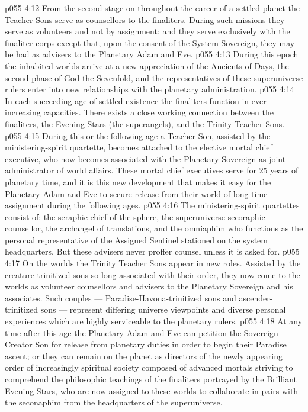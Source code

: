 \vs p055 4:12 From the second stage on throughout the career of a settled planet the Teacher Sons serve as counsellors to the finaliters. During such missions they serve as volunteers and not by assignment; and they serve exclusively with the finaliter corps except that, upon the consent of the System Sovereign, they may be had as advisers to the Planetary Adam and Eve.
\vs p055 4:13 \bibnobreakspace {} During this epoch the inhabited worlds arrive at a new appreciation of the Ancients of Days, the second phase of God the Sevenfold, and the representatives of these superuniverse rulers enter into new relationships with the planetary administration.
\vs p055 4:14 In each succeeding age of settled existence the finaliters function in ever\hyp{}increasing capacities. There exists a close working connection between the finaliters, the Evening Stars (the superangels), and the Trinity Teacher Sons.
\vs p055 4:15 During this or the following age a Teacher Son, assisted by the ministering\hyp{}spirit quartette, becomes attached to the elective mortal chief executive, who now becomes associated with the Planetary Sovereign as joint administrator of world affairs. These mortal chief executives serve for 25 years of planetary time, and it is this new development that makes it easy for the Planetary Adam and Eve to secure release from their world of long\hyp{}time assignment during the following ages.
\vs p055 4:16 The ministering\hyp{}spirit quartettes consist of: the seraphic chief of the sphere, the superuniverse secoraphic counsellor, the archangel of translations, and the omniaphim who functions as the personal representative of the Assigned Sentinel stationed on the system headquarters. But these advisers never proffer counsel unless it is asked for.
\vs p055 4:17 \bibnobreakspace {} On the worlds the Trinity Teacher Sons appear in new roles. Assisted by the creature\hyp{}trinitized sons so long associated with their order, they now come to the worlds as volunteer counsellors and advisers to the Planetary Sovereign and his associates. Such couples --- Paradise\hyp{}Havona\hyp{}trinitized sons and ascender\hyp{}trinitized sons --- represent differing universe viewpoints and diverse personal experiences which are highly serviceable to the planetary rulers.
\vs p055 4:18 At any time after this age the Planetary Adam and Eve can petition the Sovereign Creator Son for release from planetary duties in order to begin their Paradise ascent; or they can remain on the planet as directors of the newly appearing order of increasingly spiritual society composed of advanced mortals striving to comprehend the philosophic teachings of the finaliters portrayed by the Brilliant Evening Stars, who are now assigned to these worlds to collaborate in pairs with the seconaphim from the headquarters of the superuniverse.
